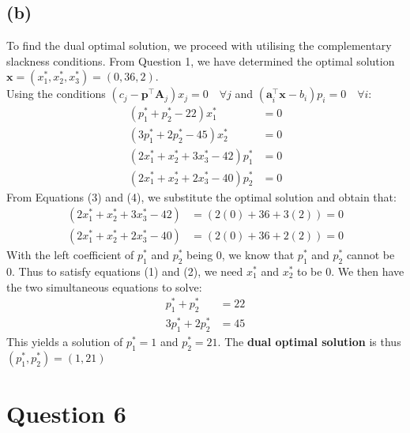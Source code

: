 \documentclass[12pt]{article}
\begin{document}
\subsection*{(b)}
To find the dual optimal solution, we proceed with utilising the complementary slackness conditions. From Question 1, we have determined the optimal solution $\mathbf{x} = (x_{1}^{*}, x_{2}^{*}, x_{3}^{*}) = (0, 36, 2)$. \\ 

\noindent Using the conditions $(c_j - \mathbf{p}^{\top}\mathbf{A}_j)x_j = 0 \quad \forall j$ and $(\mathbf{a}_i^{\top}\mathbf{x}-b_i)p_i = 0 \quad \forall i$: \begin{align}
    (p_{1}^{*} + p_{2}^{*} - 22) x_{1}^{*} &= 0 \\ 
    (3 p_{1}^{*} + 2 p_{2}^{*} - 45)x_{2}^{*} &= 0 \\ 
    (2 x_{1}^{*} + x_{2}^{*} + 3 x_{3}^{*} - 42)p_{1}^{*} &= 0 \\ 
    (2 x_{1}^{*} + x_{2}^{*} + 2 x_{3}^{*} - 40)p_{2}^{*} &= 0 
\end{align} From Equations (3) and (4), we substitute the optimal solution and obtain that: \begin{align*}
    (2 x_{1}^{*} + x_{2}^{*} + 3 x_{3}^{*} - 42) &= (2 (0) + 36 + 3 (2)) = 0 \\ 
    (2 x_{1}^{*} + x_{2}^{*} + 2 x_{3}^{*} - 40) &= (2(0) + 36 + 2(2)) = 0
\end{align*} With the left coefficient of $p_{1}^{*}$ and $p_{2}^{*}$ being 0, we know that $p_{1}^{*}$ and $p_{2}^{*}$ cannot be 0. Thus to satisfy equations (1) and (2), we need $x_{1}^{*}$ and $x_{2}^{*}$ to be 0. We then have the two simultaneous equations to solve: \begin{align*}
    p_{1}^{*} + p_{2}^{*} &= 22 \\ 
    3 p_{1}^{*} + 2 p_{2}^{*} &= 45
\end{align*} This yields a solution of $p_{1}^{*} = 1$ and $p_{2}^{*} = 21$. The \textbf{dual optimal solution }is thus $(p_{1}^{*}, p_{2}^{*}) = (1, 21)$

\newpage 

\section*{Question 6}
\end{document}

